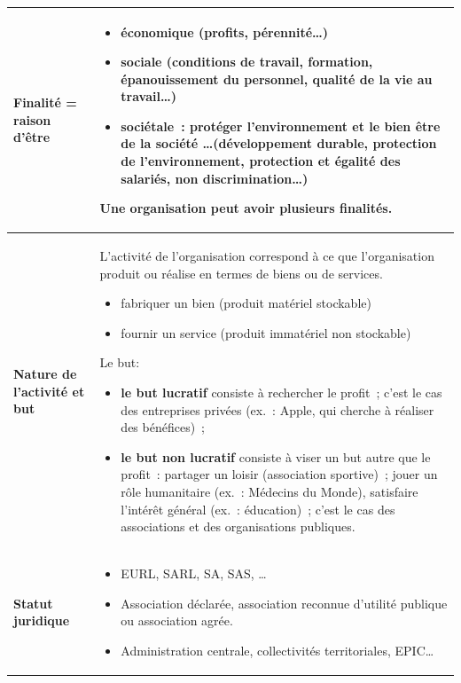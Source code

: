 \documentclass[stage1a]{tnreport} %
\begin{document}
\begin{longtable}{|>{\raggedright\arraybackslash}p{}|>{\raggedright\arraybackslash}p{}|}
  \textbf{Finalité = raison d'être}                   &
  \begin{itemize}
    \item \textbf{économique} (profits, pérennité\ldots)
    \item \textbf{sociale} (conditions de travail, formation, épanouissement du personnel, qualité de la vie au travail\ldots)
    \item \textbf{sociétale}~: protéger l'environnement et le bien être de la société \ldots (développement durable, protection de l'environnement, protection et égalité des salariés, non discrimination\ldots)
  \end{itemize}
  Une organisation peut avoir \textbf{plusieurs finalités}.                                                                                                                                                                                                                                       \\
  \hline

  \textbf{Nature de l'activité et but}                &
  L'activité de l'organisation correspond à ce que l'organisation produit ou réalise en termes de biens ou de services.
  \begin{itemize}
    \item fabriquer un bien (produit matériel stockable)
    \item fournir un service (produit immatériel non stockable)
  \end{itemize}

  Le but:
  \begin{itemize}
    \item \textbf{le but lucratif} consiste à rechercher le profit~; c'est le cas des entreprises privées (ex.~: Apple, qui cherche à réaliser des bénéfices)~;
    \item \textbf{le but non lucratif} consiste à viser un but autre que le profit~: partager un loisir (association sportive)~; jouer un rôle humanitaire (ex.~: Médecins du Monde), satisfaire l'intérêt général (ex.~: éducation)~; c'est le cas des associations et des organisations publiques.
  \end{itemize} \\ \hline

  \textbf{Statut juridique}                           &
  \begin{itemize}
    \item EURL, SARL, SA, SAS, \ldots
    \item Association déclarée, association reconnue d'utilité publique ou association
          agrée.
    \item Administration centrale, collectivités territoriales, EPIC\ldots
  \end{itemize}                                                                                                                                                                                                               \\ \hline


\end{longtable}
\end{document}

